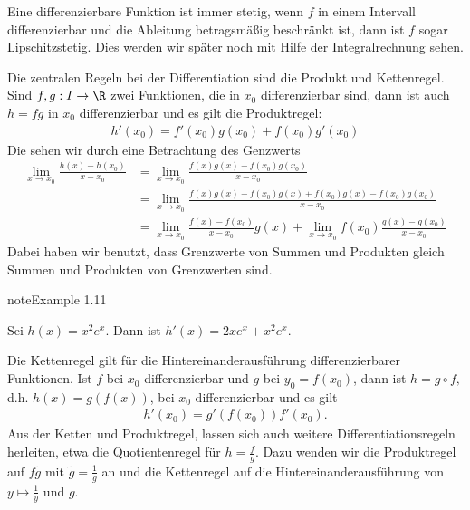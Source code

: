 \documentclass[letterpaper,10pt,english]{jupyterBook}
\begin{document}
Eine differenzierbare Funktion ist immer stetig, wenn \(f\) in einem Intervall differenzierbar und die Ableitung betragsmäßig beschränkt ist, dann ist \(f\) sogar Lipschitz\sphinxhyphen{}stetig. Dies werden wir später noch mit Hilfe der Integralrechnung sehen.

Die zentralen Regeln bei der Differentiation sind die Produkt\sphinxhyphen{} und Kettenregel. Sind \(f, g:I \rightarrow \R\) zwei Funktionen, die in \(x_0\) differenzierbar sind, dann ist auch \(h = f g\) in \(x_0\) differenzierbar und es gilt die Produktregel:
\begin{equation*}
\begin{split}h'(x_0) = f'(x_0) g(x_0) + f(x_0) g'(x_0) \end{split}
\end{equation*}
Die sehen wir durch eine Betrachtung des Genzwerts
\begin{align*}
\lim_{x \rightarrow x_0} \frac{h(x) - h(x_0)}{x-x_0} &= \lim_{x \rightarrow x_0} \frac{f(x)g(x) - f(x_0)g(x_0) }{x-x_0} \\
&= \lim_{x \rightarrow x_0} \frac{f(x)g(x) - f(x_0) g(x) +f(x_0) g(x) - f(x_0)g(x_0) }{x-x_0} \\
&= \lim_{x \rightarrow x_0} \frac{f(x)  - f(x_0)   }{x-x_0} g(x)+
\lim_{x \rightarrow x_0} f(x_0) \frac{  g(x) -  g(x_0) }{x-x_0}
\end{align*}
Dabei haben wir benutzt, dass Grenzwerte von Summen und Produkten gleich Summen und Produkten von Grenzwerten sind.
\label{vorkurs/diffnint:example-2}
\begin{sphinxadmonition}{note}{Example 1.11}



Sei \(h(x) = x^2 e^x. \) Dann ist \(h'(x) = 2x e^x + x^2 e^x\).
\end{sphinxadmonition}

Die Kettenregel gilt für die Hintereinanderausführung differenzierbarer Funktionen. Ist \(f\) bei \(x_0\) differenzierbar und \(g\) bei \(y_0=f(x_0)\), dann ist \(h = g \circ f, \) d.h. \(h(x) = g(f(x))\), bei \(x_0\) differenzierbar und es gilt
\begin{equation*}
\begin{split} h'(x_0) = g'(f(x_0)) f'(x_0). \end{split}
\end{equation*}
Aus der Ketten\sphinxhyphen{} und Produktregel, lassen sich auch weitere Differentiationsregeln herleiten, etwa die Quotientenregel für \(h= \frac{f}g\). Dazu wenden wir die Produktregel auf \(f \tilde g\) mit \(\tilde g = \frac{1}g\) an und die Kettenregel auf die Hintereinanderausführung von \(y \mapsto \frac{1}y\) und \(g\).
\end{document}
